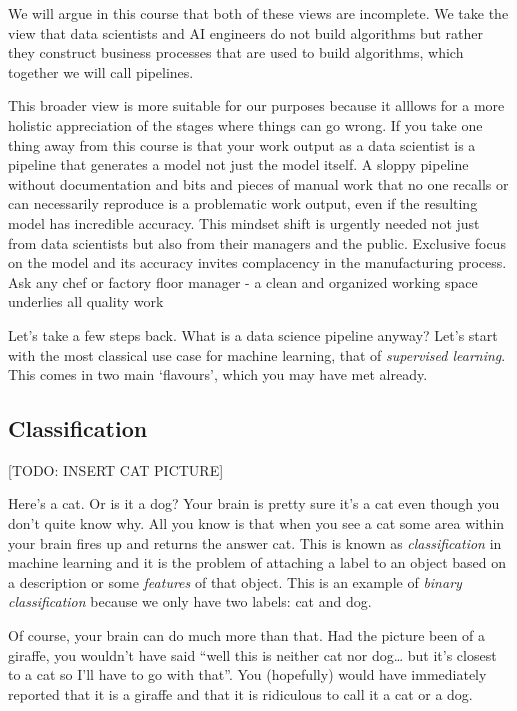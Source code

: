 \documentclass[
]{book}
\theoremstyle{definition}
\theoremstyle{definition}
\theoremstyle{definition}
\theoremstyle{definition}
\theoremstyle{remark}
\begin{document}
We will argue in this course that both of these views are incomplete. We take the view that data scientists and AI engineers do not build algorithms but rather they construct business processes that are used to build algorithms, which together we will call pipelines.

This broader view is more suitable for our purposes because it alllows for a more holistic appreciation of the stages where things can go wrong. If you take one thing away from this course is that your work output as a data scientist is a pipeline that generates a model not just the model itself. A sloppy pipeline without documentation and bits and pieces of manual work that no one recalls or can necessarily reproduce is a problematic work output, even if the resulting model has incredible accuracy. This mindset shift is urgently needed not just from data scientists but also from their managers and the public. Exclusive focus on the model and its accuracy invites complacency in the manufacturing process. Ask any chef or factory floor manager - a clean and organized working space underlies all quality work

Let's take a few steps back. What is a data science pipeline anyway? Let's start with the most classical use case for machine learning, that of \emph{supervised learning}. This comes in two main `flavours', which you may have met already.

\hypertarget{classification}{%
\subsection{Classification}\label{classification}}

{[}TODO: INSERT CAT PICTURE{]}

Here's a cat. Or is it a dog? Your brain is pretty sure it's a cat even though you don't quite know why. All you know is that when you see a cat some area within your brain fires up and returns the answer cat. This is known as \emph{classification} in machine learning and it is the problem of attaching a label to an object based on a description or some \emph{features} of that object. This is an example of \emph{binary classification} because we only have two labels: cat and dog.

Of course, your brain can do much more than that. Had the picture been of a giraffe, you wouldn't have said ``well this is neither cat nor dog\ldots{} but it's closest to a cat so I'll have to go with that''. You (hopefully) would have immediately reported that it is a giraffe and that it is ridiculous to call it a cat or a dog.
\end{document}
